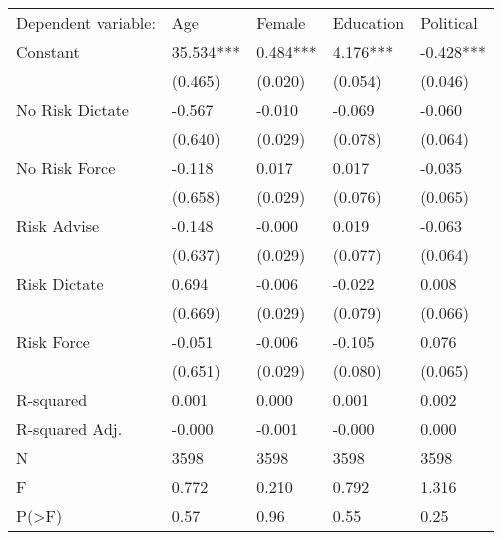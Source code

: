 \begin{tabular}{lllll}
Dependent variable: & Age & Female & Education & Political \\
Constant & 35.534*** & 0.484*** & 4.176*** & -0.428*** \\
 & (0.465) & (0.020) & (0.054) & (0.046) \\
No Risk Dictate & -0.567 & -0.010 & -0.069 & -0.060 \\
 & (0.640) & (0.029) & (0.078) & (0.064) \\
No Risk Force & -0.118 & 0.017 & 0.017 & -0.035 \\
 & (0.658) & (0.029) & (0.076) & (0.065) \\
Risk Advise & -0.148 & -0.000 & 0.019 & -0.063 \\
 & (0.637) & (0.029) & (0.077) & (0.064) \\
Risk Dictate & 0.694 & -0.006 & -0.022 & 0.008 \\
 & (0.669) & (0.029) & (0.079) & (0.066) \\
Risk Force & -0.051 & -0.006 & -0.105 & 0.076 \\
 & (0.651) & (0.029) & (0.080) & (0.065) \\
R-squared & 0.001 & 0.000 & 0.001 & 0.002 \\
R-squared Adj. & -0.000 & -0.001 & -0.000 & 0.000 \\
N & 3598 & 3598 & 3598 & 3598 \\
F & 0.772 & 0.210 & 0.792 & 1.316 \\
P(>F) & 0.57 & 0.96 & 0.55 & 0.25 \\
\end{tabular}
